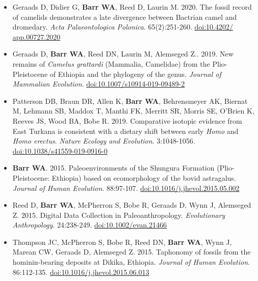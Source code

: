\documentclass{article}
\begin{document}
\begin{itemize}
\item[] Geraads D, Didier G, {\bfseries Barr WA}, Reed D, Laurin M. 2020. The fossil record of camelids demonstrates a late divergence between Bactrian camel and dromedary. \emph{Acta Palaeontologica Polonica}. 65(2):251-260. \href{https://doi.org/10.4202/app.00727.2020}{doi:10.4202/ app.00727.2020}


\item[]  Geraads D, {\bfseries Barr WA}, Reed DN, Laurin M, Alemseged Z.. 2019. New remains of \emph{Camelus grattardi} (Mammalia, Camelidae) from the Plio-Pleistocene of Ethiopia and the phylogeny of the genus. \emph{Journal of Mammalian Evolution}. \href{https://doi.org/10.1007/s10914-019-09489-2}{doi:10.1007/s10914-019-09489-2}


\item[] Patterson DB, Braun DR, Allen K, {\bfseries Barr WA}, Behrensmeyer AK, Biernat M, Lehmann SB, Maddox T, Manthi FK, Merritt SR, Morris SE, O'Brien K, Reeves JS, Wood BA, Bobe R. 2019. Comparative isotopic evidence from East Turkana is consistent with a dietary shift between early \emph{Homo} and \emph{Homo erectus}. \emph{Nature Ecology and Evolution}. 3:1048-1056. \href{https://dx.doi.org/10.1038/s41559-019-0916-0}{doi:10.1038/s41559-019-0916-0}

\item[]  {\bfseries Barr WA}. 2015. Paleoenvironments of the Shungura Formation (Plio-Pleistocene: Ethiopia) based on ecomorphology of the bovid astragalus. \emph{Journal of Human Evolution}. 88:97-107. \href{http://dx.doi.org/10.1016/j.jhevol.2015.05.002}{doi:10.1016/j.jhevol.2015.05.002}

\item[]  Reed D, {\bfseries Barr WA}, McPherron S, Bobe R, Geraads D, Wynn J, Alemseged Z. 2015. Digital Data Collection in Paleoanthropology. \emph{Evolutionary Anthropology}. 24:238-249. \href{http://dx.doi.org/10.1002/evan.21466}{doi:10.1002/evan.21466}

\item[] Thompson JC, McPherron S, Bobe R, Reed DN, {\bfseries Barr WA}, Wynn J, Marean CW, Geraads D, Alemseged Z. 2015. Taphonomy of fossils from the hominin-bearing deposits at Dikika, Ethiopia. \emph{Journal of Human Evolution}. 86:112-135. \href{http://dx.doi.org/10.1016/j.jhevol.2015.06.013}{doi:10.1016/j.jhevol.2015.06.013}

\end{itemize}
\end{document}
